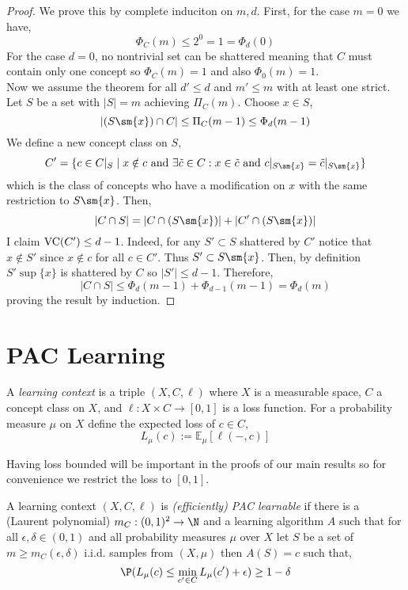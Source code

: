 \documentclass[12pt]{article}
\renewcommand{\E}{\mathbb{E}}
\begin{document}
\begin{proof}
We prove this by complete induciton on $m,d$. First, for the case $m = 0$ we have,
\[ \Phi_C(m) \le 2^0 = 1 = \Phi_d(0) \]
For the case $d = 0$, no nontrivial set can be shattered meaning that $C$ must contain only one concept so $\Phi_C(m) = 1$ and also $\Phi_0(m) = 1$.
\bigskip\\
Now we assume the theorem for all $d' \le d$ and $m' \le m$ with at least one strict. Let $S$ be a set with $|S| = m$ achieving $\Pi_C(m)$. Choose $x \in S$,
\[ | (S \sm \{ x \}) \cap C| \le \Pi_C(m - 1) \le \Phi_d(m-1) \]
We define a new concept class on $S$,
\[ C' = \{ c \in C|_S \mid x \notin c \text{ and } \exists \tilde{c} \in C : x \in \tilde{c} \text{ and } c |_{S \sm \{ x \}} = \tilde{c} |_{S \sm \{ x \}} \} \]
which is the class of concepts who have a modification on $x$ with the same restriction to $S \sm \{ x \}$. Then,
\[ |C \cap S| = |C \cap (S \sm \{ x \})| + |C' \cap (S \sm \{ x \})| \]
I claim $\mathrm{VC}(C') \le d - 1$. Indeed, for any $S' \subset S$ shattered by $C'$ notice that $x \notin S'$ since $x \notin c$ for all $c \in C'$. Thus $S' \subset S \sm \{ x \}$. Then, by definition $S' \sup \{ x \}$ is shattered by $C$ so $|S'| \le d-1$. Therefore,
\[ |C \cap S| \le \Phi_d(m-1) + \Phi_{d-1}(m-1) = \Phi_d(m) \]
proving the result by induction.
\end{proof}


\section{PAC Learning}

\begin{defn}
A \textit{learning context} is a triple $(X, C, \ell)$ where $X$ is a measurable space, $C$ a concept class on $X$, and $\ell : X \times C \to [0,1]$ is a loss function. For a probability measure $\mu$ on $X$ define the expected loss of $c \in C$,
\[ L_\mu(c) := \E_\mu[\ell(-,c)] \]
\end{defn}

\begin{rmk}
Having loss bounded will be important in the proofs of our main results so for convenience we restrict the loss to $[0,1]$.
\end{rmk}

\begin{defn}
A learning context $(X, C, \ell)$ is \textit{(efficiently) PAC learnable} if there is a (Laurent polynomial) $m_C : (0,1)^2 \to \N$ and a learning algorithm $A$ such that for all $\epsilon, \delta \in (0,1)$ and all probability measures $\mu$ over $X$ let $S$ be a set of $m \ge m_C(\epsilon, \delta)$ i.i.d. samples from $(X, \mu)$ then $A(S) = c$ such that,
\[ \P(L_\mu(c) \le \min_{c' \in C} L_\mu(c') + \epsilon) \ge 1 - \delta \]
\end{defn}
\end{document}
